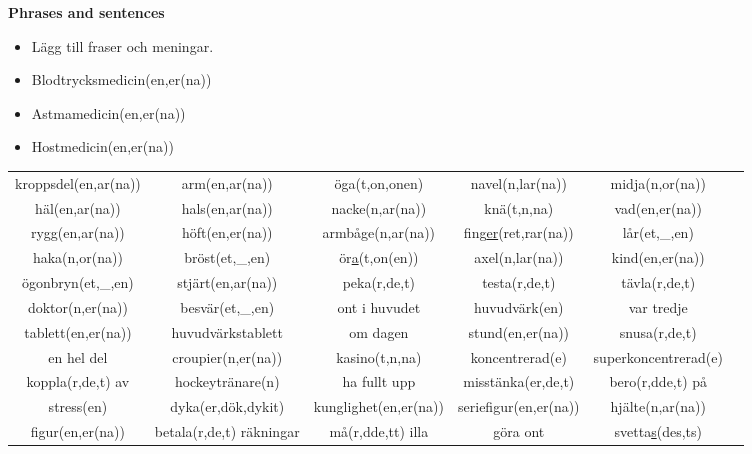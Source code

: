 
\begin{flushleft}
    \textbf{Phrases and sentences}
    \begin{itemize}
        \item Lägg till fraser och meningar.
        \item Blodtrycksmedicin(en,er(na))
        \item Astmamedicin(en,er(na))
        \item Hostmedicin(en,er(na))
    \end{itemize}
\end{flushleft}

\begin{center}
    \begin{adjustwidth}{-2.4cm}{}
        \begin{tabular}{|c c c c c c|}
            \hline
            kroppsdel(en,ar(na)) & arm(en,ar(na)) & öga(t,on,onen) & navel(n,lar(na)) & midja(n,or(na)) &  \\
            häl(en,ar(na)) & hals(en,ar(na)) & nacke(n,ar(na)) & knä(t,n,na) & vad(en,er(na)) &  \\
            rygg(en,ar(na)) & höft(en,er(na)) & armbåge(n,ar(na)) & fing\underline{er}(ret,rar(na)) & lår(et,\_,en) &  \\
            haka(n,or(na)) & bröst(et,\_,en) & ör\underline{a}(t,on(en)) & axel(n,lar(na)) & kind(en,er(na)) &  \\
            ögonbryn(et,\_,en) & stjärt(en,ar(na)) & peka(r,de,t) & testa(r,de,t) & tävla(r,de,t) &  \\
            doktor(n,er(na)) & besvär(et,\_,en) & ont i huvudet & huvudvärk(en) & var tredje &  \\
            tablett(en,er(na)) & huvudvärkstablett & om dagen & stund(en,er(na)) & snusa(r,de,t) &  \\
            en hel del & croupier(n,er(na)) & kasino(t,n,na) & koncentrerad(e) & superkoncentrerad(e) &  \\
            koppla(r,de,t) av & hockeytränare(n) & ha fullt upp & misstänka(er,de,t) & bero(r,dde,t) på &  \\
            stress(en) & dyka(er,dök,dykit) & kunglighet(en,er(na)) & seriefigur(en,er(na)) & hjälte(n,ar(na)) &  \\
            figur(en,er(na)) & betala(r,de,t) räkningar & må(r,dde,tt) illa & göra ont & svetta\underline{s}(des,ts) &  \\

\end{tabular}
\end{adjustwidth}
\end{center}
